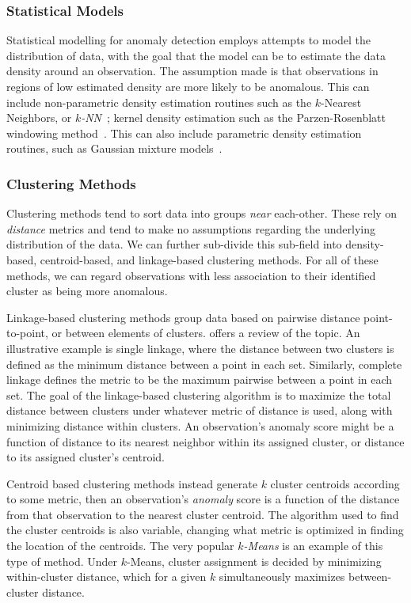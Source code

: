 \subsubsection{Statistical Models}
Statistical modelling for anomaly detection employs attempts to model the distribution of
    data, with the goal that the model can be to estimate the data density around an observation.
    The assumption made is that observations in regions of low estimated density are more likely to be
    anomalous.  This can include non-parametric density estimation routines such as the $k$-Nearest
    Neighbors, or \emph{$k$-NN}~\citep{kramer2013}; kernel density estimation such as the Parzen-Rosenblatt
    windowing method~\citep{parzen1962,rosenblatt1956}.  This can also include parametric density estimation
    routines, such as Gaussian mixture models~\citep{mcnicholas2010}.

\subsubsection{Clustering Methods}
Clustering methods tend to sort data into groups \emph{near} each-other.  These rely on \emph{distance}
    metrics and tend to make no assumptions regarding the underlying distribution of the data.  We can
    further sub-divide this sub-field into density-based, centroid-based, and linkage-based clustering
    methods.  For all of these methods, we can regard observations with less association to their identified
    cluster as being more anomalous.

Linkage-based clustering methods group data based on pairwise distance point-to-point, or between
    elements of clusters.  \cite{ackerman2010} offers a review of the topic.  An illustrative example
    is single linkage, where the distance between two clusters is defined as the minimum distance between
    a point in each set.   Similarly, complete linkage defines the metric to be the maximum pairwise
    between a point in each set.  The goal of the linkage-based clustering algorithm is to maximize the
    total distance between clusters under whatever metric of distance is used, along with minimizing
    distance within clusters.  An observation's anomaly score might be a function of distance to its nearest
    neighbor within its assigned cluster, or distance to its assigned cluster's centroid.

Centroid based clustering methods instead generate $k$ cluster centroids according to some metric,
    then an observation's \emph{anomaly} score is a function of the distance from that
    observation to the nearest cluster centroid.  The algorithm used to find the cluster
    centroids is also variable, changing what metric is optimized in finding the location of the
    centroids.  The very popular \emph{$k$-Means} \citep{hartigan1979} is an example of this type of
    method.  Under $k$-Means, cluster assignment is decided by minimizing within-cluster distance,
    which for a given $k$ simultaneously maximizes between-cluster distance.

